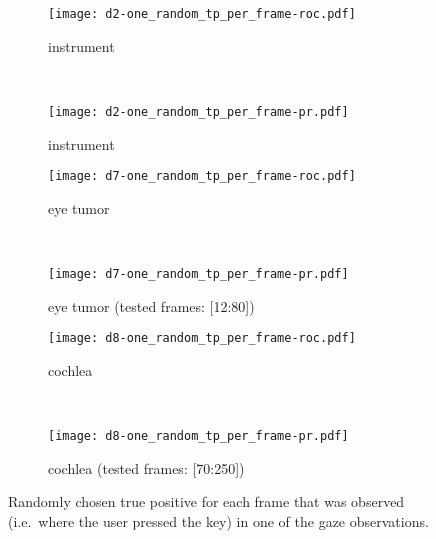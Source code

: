 \begin{figure}[ht]
	\centering
	\begin{subfigure}[h]{0.45\textwidth}
	\texttt{[image: d2-one\_random\_tp\_per\_frame-roc.pdf]}	
		\caption*{instrument}
	\end{subfigure}
	~
	\begin{subfigure}[h]{0.45\textwidth}
	\texttt{[image: d2-one\_random\_tp\_per\_frame-pr.pdf]}	
		\caption*{instrument}
	\end{subfigure}
	
	\vspace{3mm}
	\begin{subfigure}[h]{0.45\textwidth}
	\texttt{[image: d7-one\_random\_tp\_per\_frame-roc.pdf]}	
		\caption*{eye tumor}
	\end{subfigure}
	~
	\begin{subfigure}[h]{0.45\textwidth}
	\texttt{[image: d7-one\_random\_tp\_per\_frame-pr.pdf]}	
		\caption*{eye tumor (tested frames: [12:80])}
	\end{subfigure}	
	
	\vspace{3mm}
	\begin{subfigure}[h]{0.45\textwidth}
	\texttt{[image: d8-one\_random\_tp\_per\_frame-roc.pdf]}	
		\caption*{cochlea}
	\end{subfigure}
	~
	\begin{subfigure}[h]{0.45\textwidth}
	\texttt{[image: d8-one\_random\_tp\_per\_frame-pr.pdf]}	
		\caption*{cochlea (tested frames: [70:250])}
	\end{subfigure}		
	\caption{Randomly chosen true positive for each frame that was observed (i.e.\ where the user pressed the key) in one of the gaze observations.}
	\label{fig:one-random-tp-per-frame}
\end{figure}


